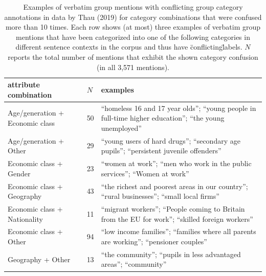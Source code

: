 \begin{table}[!th]
\centering
\caption{Examples of verbatim group mentions with conflicting group category annotations in data by Thau (2019) for category combinations that were confused more than 10 times. Each row shows (at most) three examples of verbatim group mentions that have been categorized into one of the following categories in different sentence contexts in the corpus and thus have \"conflicting\" labels. $N$ reports the total number of mentions that exhibit the shown category confusion (in all 3,571 mentions).}
\label{tableC05}
\begin{tabular}{p{2.2in} l L{3in}}
\toprule
attribute combination & $N$ & examples \\
\midrule
Age/generation + Economic class & 50 & ``homeless 16 and 17 year olds''; ``young people in full-time higher education''; ``the young unemployed'' \\
Age/generation + Other & 29 & ``young users of hard drugs''; ``secondary age pupils''; ``persistent juvenile offenders'' \\
Economic class + Gender & 23 & ``women at work''; ``men who work in the public services''; ``Women at work'' \\
Economic class + Geography & 43 & ``the richest and poorest areas in our country''; ``rural businesses''; ``small local firms'' \\
Economic class + Nationality & 11 & ``migrant workers''; ``People coming to Britain from the EU for work''; ``skilled foreign workers'' \\
Economic class + Other & 94 & ``low income families''; ``families where all parents are working''; ``pensioner couples'' \\
Geography + Other & 13 & ``the community''; ``pupils in less advantaged areas''; ``community'' \\
\bottomrule
\end{tabular}
\end{table}
